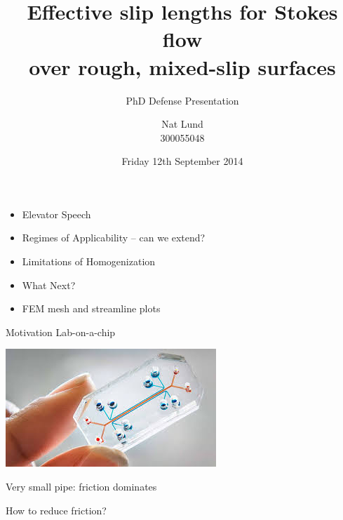 \documentclass{beamer}
\title{Effective slip lengths for Stokes flow \\ over rough, mixed-slip surfaces}
\subtitle{\color{red}PhD Defense Presentation}
\author{Nat Lund \\ 300055048}
\institute{Victoria University of Wellington}
\date{Friday 12th September 2014}
\begin{document}
\begin{frame}
\maketitle
\end{frame}


\begin{frame}
\begin{itemize}
\item Elevator Speech
\item Regimes of Applicability -- can we extend?
\item Limitations of Homogenization
\item What Next?
\item FEM mesh and streamline plots
\end{itemize}

\end{frame}

\begin{frame}{Motivation}
Lab-on-a-chip

\begin{center}
\includegraphics[scale=0.5]{lab-on-chip.jpg}
\end{center}

Very small pipe: friction dominates

\vspace{1em}
How to reduce friction?
\end{frame}
\end{document}

